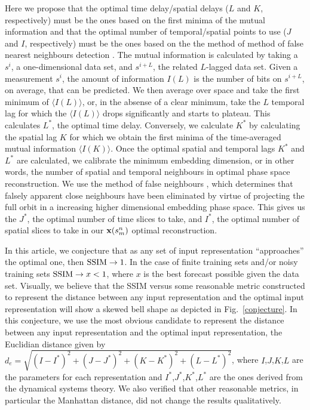 \documentclass[journal]{IEEEtran}
\begin{document}
Here we propose that the optimal time delay/spatial delays ($L$ and $K$, respectively) must be the ones based on the first minima of the mutual 
information \cite{Fraser86, abarbanel1997analysis, opac-b1092652} and that the optimal number of temporal/spatial points to use ($J$ and $I$, 
respectively) must be the ones based on the  the method of method of false nearest neighbours detection \cite{1992PhRvA..45.3403K, 
1992PhRvA..45.7058M, 1993RvMP...65.1331A, 1996PhT....49k..86A, abarbanel1997analysis}.  The mutual information is calculated by taking a $s^{i}$, a 
one-dimensional data set, and $s^{i+L}$, the related $L$-lagged data set. Given a measurement $s^i$, the amount of information $I(L)$ is the number 
of bits on $s^{i+L}$, on average, that can be predicted. We then average over space and take the first minimum of $\langle I(L) \rangle$, or, in the 
absense of a clear minimum, take the $L$ temporal lag for which the $\langle I(L) \rangle$ drops significantly and starts to plateau. This calculates 
$L^*$, the optimal time delay. Conversely, we calculate $K^*$ by calculating the spatial lag $K$ for which we obtain the first minima of the 
time-averaged mutual information $\langle I(K) \rangle$. Once the optimal spatial and temporal lags $K^*$ and $L^*$ are calculated, we calibrate 
the minimum embedding dimension, or in other words, the number of spatial and temporal neighbours in optimal  
phase space reconstruction. We use the method of false neighbours \cite{1992PhRvA..45.3403K, 1992PhRvA..45.7058M,1993RvMP...65.1331A},
which determines that falsely apparent close neighbours have been 
eliminated by virtue of projecting the full orbit in a increasing higher dimensional embedding phase space. This gives us the 
$J^*$, the optimal number of time slices to take,
and $I^*$, the optimal number of spatial slices to take in our ${\bf x}(s^n_m)$ optimal reconstruction.

In this article, we conjecture that as any set of input representation 
``approaches'' the optimal one, then $\textnormal{SSIM} \to 1$. In the case of finite training sets and/or noisy training sets  
$\textnormal{SSIM} \to x<1$, where $x$ is the best forecast possible given the data set. Visually, we believe that the SSIM versus some reasonable 
metric constructed to represent the distance between any input representation and the optimal input representation will show a skewed bell shape 
as depicted in Fig.\ \ref{conjecture}. In this conjecture, we use the most obvious candidate to represent the distance between any input 
representation and the optimal   input representation, the Euclidian distance given by   
$d_e=\sqrt{(I-I^*)^2+(J-J^*)^2+(K-K^*)^2+(L-L^*)^2}$, where $I$,$J$,$K$,$L$ are the parameters for each representation
and $I^*$,$J^*$,$K^*$,$L^*$ are the ones derived from the dynamical systems theory. We also verified that other reasonable metrics,   
in particular the Manhattan distance\cite{0486252027}, did 
not change the results qualitatively.
 
\end{document}
